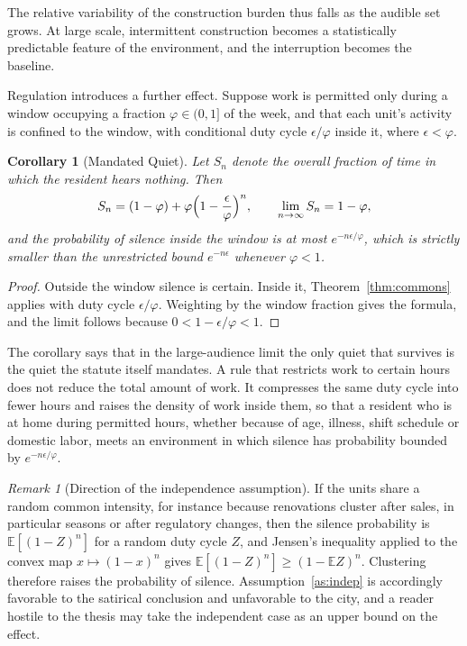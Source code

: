 \documentclass[11pt]{article}
\newtheorem{corollary}[theorem]{Corollary}
\theoremstyle{definition}
\theoremstyle{remark}
\newtheorem{remark}[theorem]{Remark}
\newcommand{\E}{\mathbb{E}}
\begin{document}
The relative variability of the construction burden thus falls as the audible set grows. At large scale, intermittent construction becomes a statistically predictable feature of the environment, and the interruption becomes the baseline.

Regulation introduces a further effect. Suppose work is permitted only during a window occupying a fraction $\varphi\in(0,1]$ of the week, and that each unit's activity is confined to the window, with conditional duty cycle $\epsilon/\varphi$ inside it, where $\epsilon<\varphi$.

\begin{corollary}[Mandated Quiet]\label{cor:window}
Let $S_n$ denote the overall fraction of time in which the resident hears nothing. Then
\[
S_n = (1-\varphi) + \varphi\Bigl(1-\frac{\epsilon}{\varphi}\Bigr)^n, \qquad \lim_{n\to\infty}S_n = 1-\varphi,
\]
and the probability of silence inside the window is at most $e^{-n\epsilon/\varphi}$, which is strictly smaller than the unrestricted bound $e^{-n\epsilon}$ whenever $\varphi<1$.
\end{corollary}

\begin{proof}
Outside the window silence is certain. Inside it, Theorem~\ref{thm:commons} applies with duty cycle $\epsilon/\varphi$. Weighting by the window fraction gives the formula, and the limit follows because $0<1-\epsilon/\varphi<1$.
\end{proof}

The corollary says that in the large-audience limit the only quiet that survives is the quiet the statute itself mandates. A rule that restricts work to certain hours does not reduce the total amount of work. It compresses the same duty cycle into fewer hours and raises the density of work inside them, so that a resident who is at home during permitted hours, whether because of age, illness, shift schedule or domestic labor, meets an environment in which silence has probability bounded by $e^{-n\epsilon/\varphi}$.

\begin{remark}[Direction of the independence assumption]
If the units share a random common intensity, for instance because renovations cluster after sales, in particular seasons or after regulatory changes, then the silence probability is $\E[(1-Z)^n]$ for a random duty cycle $Z$, and Jensen's inequality applied to the convex map $x\mapsto(1-x)^n$ gives $\E[(1-Z)^n]\ge(1-\E Z)^n$. Clustering therefore raises the probability of silence. Assumption~\ref{as:indep} is accordingly favorable to the satirical conclusion and unfavorable to the city, and a reader hostile to the thesis may take the independent case as an upper bound on the effect.
\end{remark}
\end{document}
